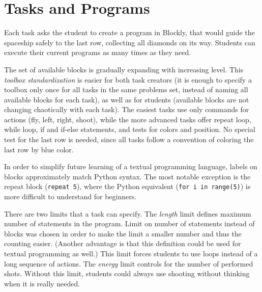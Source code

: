 \section{Tasks and Programs}
\label{sec:robomission.programs}

Each task asks the student to create a program in Blockly,
that would guide the spaceship safely to the last row,
collecting all diamonds on its way. %
Students can execute their current programs as many times
as they need. %

The set of available blocks is gradually expanding with
increasing level. This \emph{toolbox standardization}
is easier for both task creators (it is enough to specify
a toolbox only once for all tasks in the same problems set,
instead of naming all available blocks for each task),
as well as for  students
(available blocks are not changing chaotically with each task).
The easiest tasks use only commands for actions (fly, left, right, shoot),
while the more advanced tasks offer repeat loop, while loop, if and if-else statements,
and tests for colors and position.
No special test for the last row is needed, since all tasks follow a convention
of coloring the last row by blue color.

In order to simplify future learning of a textual programming language,
labels on blocks approximately match Python syntax. %
The most notable exception is the repeat block (\texttt{repeat 5}),
where the Python equivalent (\texttt{for i in range(5)}) is more difficult
to understand for beginners.

There are two limits that a task can specify.
The \emph{length} limit defines maximum number of statements
in the program. Limit on number of statements instead of blocks was chosen in
order to make the limit a smaller number and thus the counting easier.
(Another advantage is that this definition could be used for textual
programming as well.)
This limit forces students to use loops instead of a long sequence of
actions.
The \emph{energy} limit controls for the number
of performed shots. Without this limit, students could always use
shooting without thinking when it is really needed.


